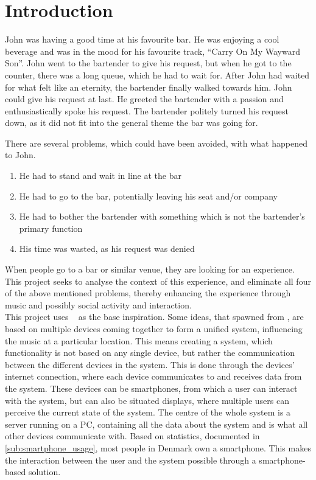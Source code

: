 \chapter{Introduction}\label{introduction}
John was having a good time at his favourite bar. He was enjoying a cool beverage and was in the mood for his favourite track, \enquote{Carry On My Wayward Son}. John went to the bartender to give his request, but when he got to the counter, there was a long queue, which he had to wait for. After John had waited for what felt like an eternity, the bartender finally walked towards him. John could give his request at last. He greeted the bartender with a passion and enthusiastically spoke his request. The bartender politely turned his request down, as it did not fit into the general theme the bar was going for.

There are several problems, which could have been avoided, with what
happened to John.

\begin{enumerate}
	\item He had to stand and wait in line at the bar
	\item He had to go to the bar, potentially leaving his seat and/or
company
	\item He had to bother the bartender with something which is not the bartender's primary function
	\item His time was wasted, as his request was denied
\end{enumerate}

When people go to a bar or similar venue, they are looking for an experience. This project seeks to analyse the context of this experience, and eliminate all four of the above mentioned problems, thereby enhancing the experience through music and possibly social activity and interaction.\\

This project uses ~\cite{sorensen2012} as the base inspiration.
Some ideas, that spawned from , are based on multiple devices coming together to form a unified system, influencing the music at a particular location. This means creating a system, which functionality is not based on any single device, but rather the communication between the different devices in the system.
This is done through the devices’ internet connection, where each device communicates to and receives data from the system. These devices can be smartphones, from which a user can interact with the system, but can also be situated displays, where multiple users can perceive the current state of the system. The centre of the whole system is a server running on a PC, containing all the data about the system and is what all other devices communicate with. Based on statistics, documented in \cref{sub:smartphone_usage}, most people in Denmark own a smartphone. This makes the interaction between the user and the system possible through a smartphone-based solution.  

